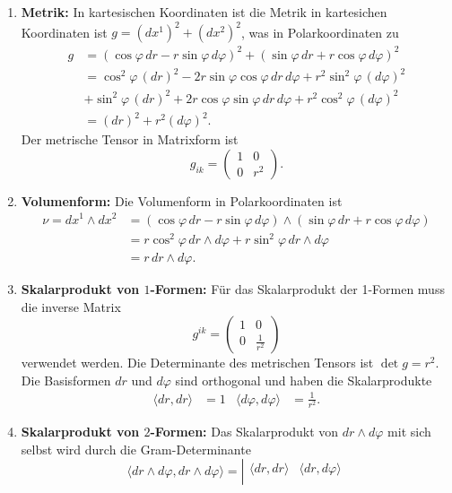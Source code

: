 \begin{enumerate}
\item
{\bf Metrik:}
In kartesischen Koordinaten ist die Metrik in kartesichen Koordinaten
ist $g=(dx^1)^2+(dx^2)^2$, was in Polarkoordinaten zu
\begin{align*}
g
&=
(\cos\varphi\,dr - r\sin\varphi\,d\varphi)^2
+
(\sin\varphi\,dr + r\cos\varphi\,d\varphi)^2
\\
&=
\cos^2\varphi\,(dr)^2
-
2r\sin\varphi\cos\varphi\,dr\,d\varphi
+
r^2\sin^2\varphi\,(d\varphi)^2
\\
&+
\sin^2\varphi\,(dr)^2
+
2r\cos\varphi\sin\varphi\,dr\,d\varphi
+
r^2\cos^2\varphi\,(d\varphi)^2
\\
&=
(dr)^2 + r^2(d\varphi)^2.
\end{align*}
Der metrische Tensor in Matrixform ist
\[
g_{ik}
=
\begin{pmatrix}
1&0\\
0&r^2
\end{pmatrix}.
\]
\item {\bf Volumenform:}
Die Volumenform in Polarkoordinaten ist
\begin{align*}
\nu
=
dx^1\wedge dx^2
&=
(\cos\varphi\,dr - r\sin\varphi\,d\varphi)
\wedge
(\sin\varphi\,dr + r\cos\varphi\,d\varphi)
\\
&=
r \cos^2\varphi\,dr \wedge d\varphi
+
r \sin^2\varphi\,dr \wedge d\varphi
\\
&= r \,dr\wedge d\varphi.
\end{align*}
\item{\bf Skalarprodukt von $1$-Formen:}
Für das Skalarprodukt der 1-Formen muss die inverse Matrix
\[
g^{ik}
=
\begin{pmatrix}
1&0\\
0&\frac{1}{r^2}
\end{pmatrix}
\]
verwendet werden.
Die Determinante des metrischen Tensors ist $\det g = r^2$.
Die Basisformen $dr$ und $d\varphi$ sind orthogonal und haben die
Skalarprodukte
\begin{align*}
\langle dr,dr\rangle
&=
1
&
\langle d\varphi,d\varphi\rangle
&=
\frac{1}{r^2}.
\end{align*}
\item{\bf Skalarprodukt von $2$-Formen:}
Das Skalarprodukt von $dr\wedge d\varphi$ mit sich selbst wird durch die
Gram-Determinante
\[
\langle dr\wedge d\varphi,dr\wedge d\varphi\rangle
=
\left|
\begin{matrix}
\langle dr,dr\rangle         & \langle dr,d\varphi\rangle \\

\end{matrix}\]
\end{enumerate}
